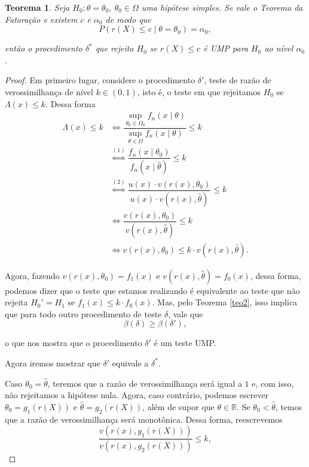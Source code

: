 \documentclass{article}
\newtheorem{theorem}{Teorema}
\begin{document}
\begin{theorem}\label{teo3}
    Seja $H_0 : \theta = \theta_0, ~\theta_0 \in \Omega$ uma hipótese simples. Se vale o Teorema da Fatoração e existem $c$ e $\alpha_0$ de modo que
    \[P(r(X) \leq c \mid \theta = \theta_0) = \alpha_0,\]
    
    \noindent então o procedimento $\delta^*$ que rejeita $H_0$ se $r(X) \leq c$ é UMP para $H_0$ ao nível $\alpha_0$.
\end{theorem}

\begin{proof}
    Em primeiro lugar, considere o procedimento $\delta'$, teste de razão de verossimilhança de nível $k \in (0, 1)$, isto é, o teste em que rejeitamos $H_0$ se $\Lambda(x) \leq k$. Dessa forma
    \begin{equation*}
        \begin{split}
            \Lambda(x) \leq k & \iff \dfrac{\sup_{\theta_0 \in \Omega_0} f_n(x \mid \theta)}{\sup_{\theta \in \Omega} f_n(x \mid \theta)} \leq k \\
            & \overset{(1)}{\iff} \dfrac{f_n\left(x \mid \theta_0\right)}{f_n\left(x \mid \hat{\theta}\right)} \leq k \\
            & \overset{(2)}{\iff} \dfrac{u(x)\cdot v\left(r(x), \theta_0\right)}{u(x)\cdot v\left(r(x), \hat{\theta}\right)} \leq k \\
            & \iff \dfrac{v\left(r(x), \theta_0\right)}{v\left(r(x), \hat{\theta}\right)} \leq k \\
            & \iff v\left(r(x), \theta_0\right) \leq k\cdot v\left(r(x), \hat{\theta}\right).
        \end{split}
    \end{equation*}
    
    Agora, fazendo $v\left(r(x), \theta_0\right) = f_1(x)$ e $v\left(r(x), \hat{\theta}\right) = f_0(x)$, dessa forma, podemos dizer que o teste que estamos realizando é equivalente ao teste que não rejeita $H_0' = H_1$ se $f_1(x) \leq k\cdot f_0(x)$. Mas, pelo Teorema \ref{teo2}, isso implica que para todo outro procedimento de teste $\delta$, vale que 
    \[\beta(\delta) \geq \beta(\delta'),\]
    
    \noindent o que nos mostra que o procedimento $\delta'$ é um teste UMP.
    
    Agora iremos mostrar que $\delta'$ equivale a $\delta^*$.
    
    Caso $\theta_0 = \hat{\theta}$, teremos que a razão de verossimilhança será igual a $1$ e, com isso, não rejeitamos a hipótese nula. Agora, caso contrário, podemos escrever $\theta_0 = g_1(r(X))$ e $\hat{\theta} = g_2(r(X))$, além de supor que $\theta \in \mathds{R}$. Se $\theta_0 < \hat{\theta}$, temos que a razão de verossimilhança será monotônica. Dessa forma, reescrevemos
    \[\dfrac{v\left(r(x), g_1(r(X))\right)}{v\left(r(x), g_2(r(X))\right)} \leq k,\]
    

\end{proof}
\end{document}
